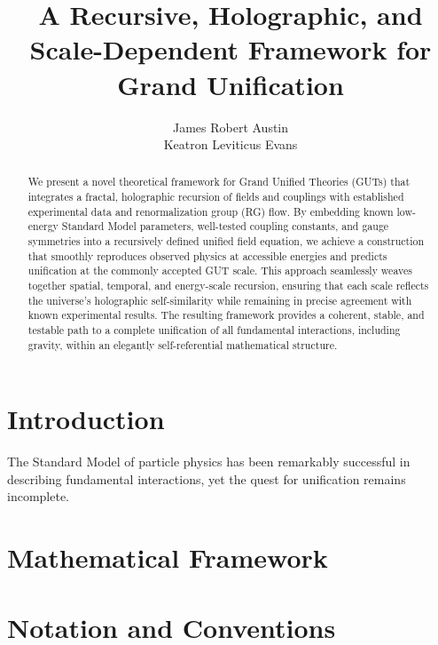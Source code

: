\documentclass[12pt]{article}
\title{A Recursive, Holographic, and Scale-Dependent Framework for Grand Unification}
\author{James Robert Austin \\ Keatron Leviticus Evans}
\begin{document}
\maketitle

\begin{abstract}
We present a novel theoretical framework for Grand Unified Theories (GUTs) that integrates a fractal, holographic recursion of fields and couplings with established experimental data and renormalization group (RG) flow. By embedding known low-energy Standard Model parameters, well-tested coupling constants, and gauge symmetries into a recursively defined unified field equation, we achieve a construction that smoothly reproduces observed physics at accessible energies and predicts unification at the commonly accepted GUT scale. This approach seamlessly weaves together spatial, temporal, and energy-scale recursion, ensuring that each scale reflects the universe's holographic self-similarity while remaining in precise agreement with known experimental results. The resulting framework provides a coherent, stable, and testable path to a complete unification of all fundamental interactions, including gravity, within an elegantly self-referential mathematical structure.
\end{abstract}

\section{Introduction}

The Standard Model of particle physics \cite{pdg2022} has been remarkably successful in describing fundamental interactions, yet the quest for unification remains incomplete.

\section{Mathematical Framework}
\label{sec:math_framework}

\section{Notation and Conventions}
\end{document}
